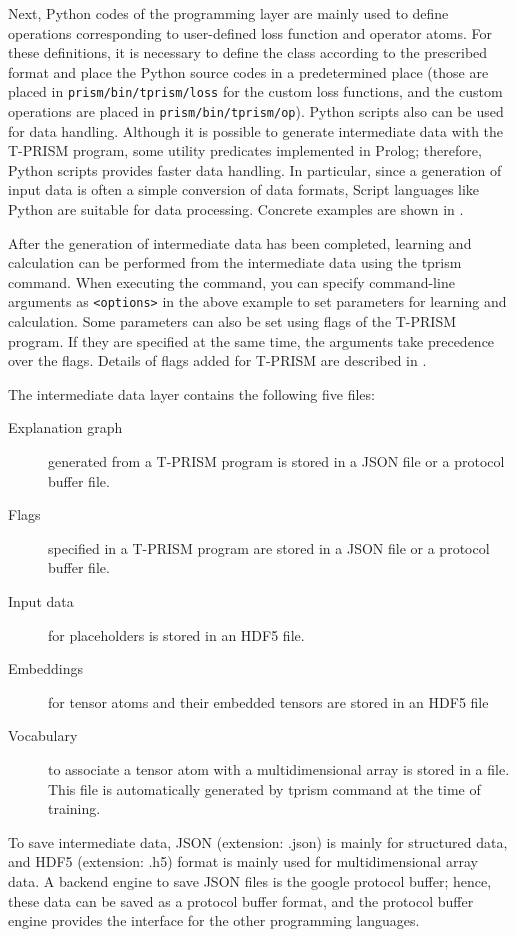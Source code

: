 \documentclass[a4paper]{report}
\begin{document}
Next, Python codes of the programming layer are mainly used to define operations corresponding to user-defined loss function and operator atoms.
For these definitions, it is necessary to define the class according to the prescribed format and place the Python source codes in a predetermined place (those are placed in {\tt prism/bin/tprism/loss} for the custom loss functions, and the custom operations are placed in {\tt prism/bin/tprism/op}).
Python scripts also can be used for data handling.
Although it is possible to generate intermediate data with the T-PRISM program,
some utility predicates implemented in Prolog; therefore, Python scripts provides faster data handling.
In particular, since a generation of input data is often a simple conversion of data formats, Script languages like Python are suitable for data processing.
Concrete examples are shown in .


After the generation of intermediate data has been completed, learning and calculation can be performed from the intermediate data using the tprism command.
When executing the command, you can specify command-line arguments as \verb|<options>| in the above example to  set parameters for learning and calculation.
Some parameters can also be set using flags of the T-PRISM program.
If they are specified at the same time, the arguments take precedence over the flags.
Details of flags added for T-PRISM are described in .

The intermediate data layer contains the following five files:
\begin{description}
	\item[Explanation graph] generated from a T-PRISM program is stored in a JSON file or a protocol buffer file.
	\item[Flags] specified in a T-PRISM program are stored in a JSON file or a protocol buffer file.
	\item[Input data] for placeholders is stored in an HDF5 file.
	\item[Embeddings] for tensor atoms and their embedded tensors are stored in an HDF5 file
	\item[Vocabulary] to associate a tensor atom with a multidimensional array is stored in a file. This file is automatically generated by tprism command at the time of training.
\end{description}
To save intermediate data, JSON (extension: .json) is mainly for structured data, and HDF5 (extension: .h5) format is mainly used for multidimensional array data.
A backend engine to save JSON files is the google protocol buffer; hence, these data can be saved as a protocol buffer format, and the protocol buffer engine provides the interface for the other programming languages.
\end{document}
